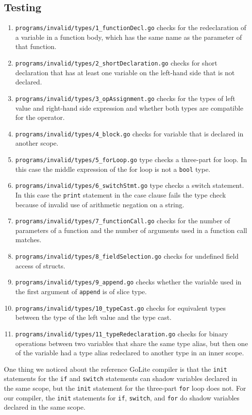 \documentclass{article}
\begin{document}
\subsection*{Testing}
\begin{enumerate}
	\item \verb|programs/invalid/types/1_functionDecl.go| checks for the redeclaration of a variable in a function body, which has the same name as the parameter of that function.
	\item \verb|programs/invalid/types/2_shortDeclaration.go| checks for short declaration that has at least one variable on the left-hand side that is not declared.
	\item \verb|programs/invalid/types/3_opAssignment.go| checks for the types of left value and right-hand side expression and whether both types are compatible for the operator.
	\item \verb|programs/invalid/types/4_block.go| checks for variable that is declared in another scope.
	\item \verb|programs/invalid/types/5_forLoop.go| type checks a three-part for loop. In this case the middle expression of the for loop is not a \verb|bool| type.
	\item \verb|programs/invalid/types/6_switchStmt.go| type checks a switch statement. In this case the \verb|print| statement in the case clause fails the type check because of invalid use of arithmetic negation on a string.
	\item \verb|programs/invalid/types/7_functionCall.go| checks for the number of parameters of a function and the number of arguments used in a function call matches.
	\item \verb|programs/invalid/types/8_fieldSelection.go| checks for undefined field access of structs.
	\item \verb|programs/invalid/types/9_append.go| checks whether the variable used in the first argument of \verb|append| is of slice type.
	\item \verb|programs/invalid/types/10_typeCast.go| checks for equivalent types between the type of the left value and the type cast.
	\item \verb|programs/invalid/types/11_typeRedeclaration.go| checks for binary operations between two variables that share the same type alias, but then one of the variable had a type alias redeclared to another type in an inner scope.
\end{enumerate}

One thing we noticed about the reference GoLite compiler is that the \verb|init| statements for the \verb|if| and \verb|switch| statements can shadow variables declared in the same scope, but the \verb|init| statement for the three-part \verb|for| loop does not. For our compiler, the \verb|init| statements for \verb|if|, \verb|switch|, and \verb|for| do shadow variables declared in the same scope.
\end{document}

